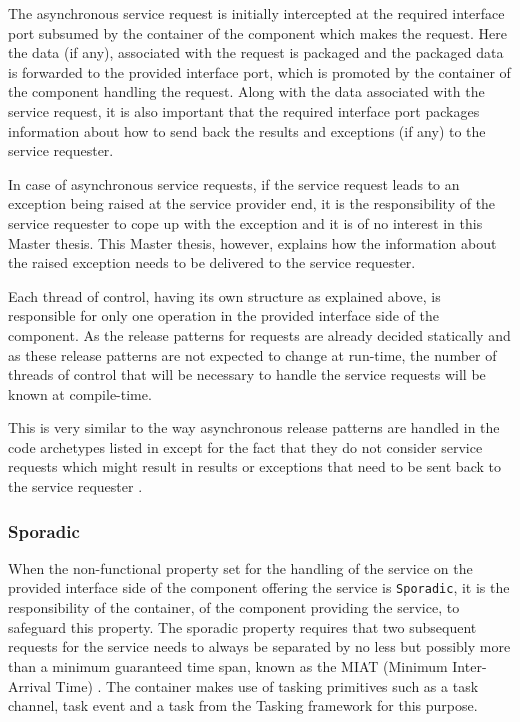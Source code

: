 The asynchronous service request is initially intercepted at the required interface port subsumed by the container of the component which makes the request. Here the data (if any), associated with the request is packaged and the packaged data is forwarded to the provided interface port, which is promoted by the container of the component handling the request. Along with the data associated with the service request, it is also important that the required interface port packages information about how to send back the results and exceptions (if any) to the service requester.

In case of asynchronous service requests, if the service request leads to an exception being raised at the service provider end, it is the responsibility of the service requester to cope up with the exception and it is of no interest in this Master thesis. This Master thesis, however, explains how the information about the raised exception needs to be delivered to the service requester. 

Each thread of control, having its own structure as explained above, is responsible for only one operation in the provided interface side of the component. As the release patterns for requests are already decided statically and as these release patterns are not expected to change at run-time, the number of threads of control that will be necessary to handle the service requests will be known at compile-time.

This is very similar to the way asynchronous release patterns are handled in the code archetypes listed in \cite{CharEvoRAVCodeAr,EvoRAVCodeAr} except for the fact that they do not consider service requests which might result in results or exceptions that need to be sent back to the service requester \cite{CharEvoRAVCodeAr}. 

\subsubsection{\textbf{Sporadic}}
When the non-functional property set for the handling of the service on the provided interface side of the component offering the service is \texttt{Sporadic}, it is the responsibility of the container, of the component providing the service, to safeguard this property. The sporadic property requires that two subsequent requests for the service needs to always be separated by no less but possibly more than a minimum guaranteed time span, known as the MIAT (Minimum Inter-Arrival Time) \cite{SpecMetamodel,CompBasedProcess}. The container makes use of tasking primitives such as a task channel, task event and a task from the Tasking framework for this purpose.

